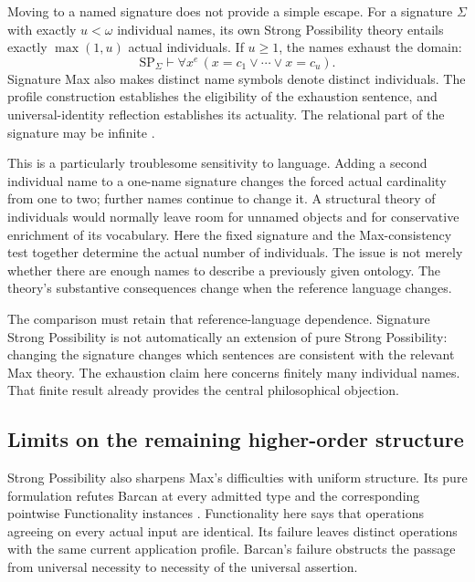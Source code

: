 \documentclass[12pt,letterpaper]{article}
\begin{document}
Moving to a named signature does not provide a simple escape. For a signature $\Sigma$ with exactly $u<\omega$ individual names, its own Strong Possibility theory entails exactly $\max(1,u)$ actual individuals. If $u\ge1$, the names exhaust the domain:
\begin{equation}\label{eq:exhaustion}
 \mathrm{SP}_{\Sigma}\vdash
 \forall x^e\,(x=c_1\lor\cdots\lor x=c_u).
\end{equation}
Signature Max also makes distinct name symbols denote distinct individuals. The profile construction establishes the eligibility of the exhaustion sentence, and universal-identity reflection establishes its actuality. The relational part of the signature may be infinite \citep[\S10]{spsignature}.

This is a particularly troublesome sensitivity to language. Adding a second individual name to a one-name signature changes the forced actual cardinality from one to two; further names continue to change it. A structural theory of individuals would normally leave room for unnamed objects and for conservative enrichment of its vocabulary. Here the fixed signature and the Max-consistency test together determine the actual number of individuals. The issue is not merely whether there are enough names to describe a previously given ontology. The theory's substantive consequences change when the reference language changes.

The comparison must retain that reference-language dependence. Signature Strong Possibility is not automatically an extension of pure Strong Possibility: changing the signature changes which sentences are consistent with the relevant Max theory. The exhaustion claim here concerns finitely many individual names. That finite result already provides the central philosophical objection.

\subsection{Limits on the remaining higher-order structure}

Strong Possibility also sharpens Max's difficulties with uniform structure. Its pure formulation refutes Barcan at every admitted type and the corresponding pointwise Functionality instances \citep[\S6.3]{spprofileaudit}. Functionality here says that operations agreeing on every actual input are identical. Its failure leaves distinct operations with the same current application profile. Barcan's failure obstructs the passage from universal necessity to necessity of the universal assertion.
\end{document}
